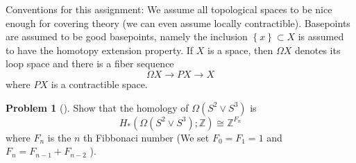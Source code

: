 \documentclass[reqno]{amsart}
\theoremstyle{definition}
\newtheorem{problem}[theorem]{Problem}
\theoremstyle{remark}
\begin{document}
    Conventions for this assignment: We assume
    all topological spaces to be nice enough for covering
    theory (we can even assume locally contractible).
    Basepoints are assumed to be good basepoints, namely
    the inclusion $\left\{ x \right\} \subset 
    X$ is assumed to have the homotopy extension property.
    If
    $X$ is a space, then $\Omega X$ denotes
    its loop space and there is a fiber sequence
    \[
    \Omega X \to PX \to X
    \] 
    where $PX$ is a contractible space.


    \begin{problem}[]
        Show that the homology of
        $\Omega\left( S^2 \vee S^3 \right) $ is
        \[
        H_* \left( \Omega \left( S^2 \vee S^3 \right) ;
        \mathbb{Z}\right) \cong
        \mathbb{Z}^{F_n}
        \] 
        where $F_n$ is the $n$ th Fibbonaci number
        (We set $F_0 = F_1 = 1$ and
        $F_n = F_{n-1} + F_{n-2}$ ).
    \end{problem}
\end{document}
